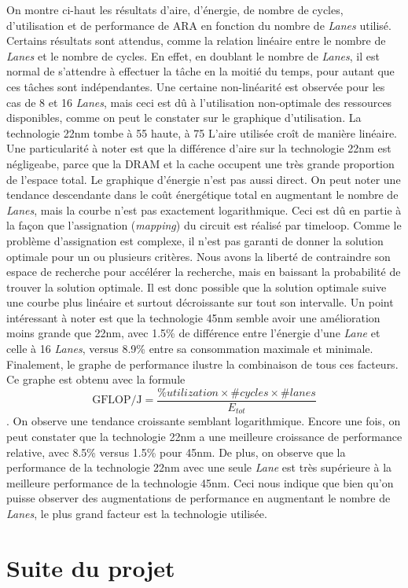 \documentclass[11pt,letterpaper]{article}
\begin{document}
On montre ci-haut les résultats d'aire, d'énergie, de nombre de cycles, d'utilisation et de performance 
de ARA en fonction du nombre de \textit{Lanes} utilisé. Certains résultats sont attendus, comme la relation 
linéaire entre le nombre de \textit{Lanes} et le nombre de cycles. En effet, en doublant le nombre de \textit{Lanes}, 
il est normal de s'attendre à effectuer la tâche en la moitié du temps, pour autant que ces tâches sont indépendantes.
Une certaine non-linéarité est observée pour les cas de 8 et 16 \textit{Lanes}, mais ceci est dû à l'utilisation 
non-optimale des ressources disponibles, comme on peut le constater sur le graphique d'utilisation. La technologie 
22nm tombe à 55%
haute, à 75%
L'aire utilisée croît de manière linéaire. Une particularité à noter est que la différence d'aire sur la technologie 
22nm est négligeabe, parce que la DRAM et la cache occupent une très grande proportion de l'espace total. 
Le graphique d'énergie n'est pas aussi direct. On peut noter une tendance descendante dans le coût énergétique total 
en augmentant le nombre de \textit{Lanes}, mais la courbe n'est pas exactement logarithmique. Ceci est dû en partie à 
la façon que l'assignation (\textit{mapping}) du circuit est réalisé par timeloop. Comme le problème d'assignation
est complexe, il n'est pas garanti de donner la solution optimale pour un ou plusieurs critères. Nous avons la liberté
de contraindre son espace de recherche pour accélérer la recherche, mais en baissant la probabilité de trouver la 
solution optimale. Il est donc possible que la solution optimale suive une courbe plus linéaire et surtout décroissante
sur tout son intervalle. Un point intéressant à noter est que la technologie 45nm semble avoir une amélioration moins 
grande que 22nm, avec 1.5\% de différence entre l'énergie d'une \textit{Lane} et celle à 16 \textit{Lanes}, versus 
8.9\% entre sa consommation maximale et minimale. Finalement, le graphe de performance ilustre la combinaison de tous 
ces facteurs. Ce graphe est obtenu avec la formule $$\text{GFLOP/J} = \frac{\%utilization \times \#cycles \times \#lanes}{E_{tot}}$$.
On observe une tendance croissante semblant logarithmique. Encore une fois, on peut constater que la technologie 22nm 
a une meilleure croissance de performance relative, avec 8.5\% versus 1.5\% pour 45nm. De plus, on observe que la 
performance de la technologie 22nm avec une seule \textit{Lane} est très supérieure à la meilleure performance de la 
technologie 45nm. Ceci nous indique que bien qu'on puisse observer des augmentations de performance en augmentant le nombre
de \textit{Lanes}, le plus grand facteur est la technologie utilisée.


\section*{Suite du projet}
\end{document}
